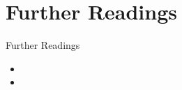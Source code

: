 \section{Further Readings}

 {\begin{frame}{Further Readings}
	  \begin{itemize}
		  \setlength\itemsep{0.3cm}
		  \item {}
		  \item {}
	  \end{itemize}



  \end{frame}
 }



